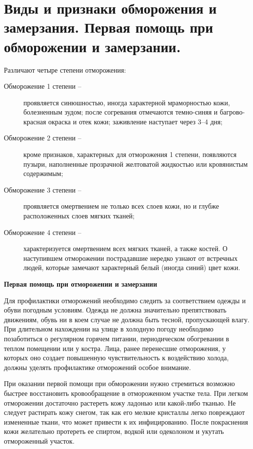\documentclass[12pt,a4paper]{report}
\begin{document}
\section{Виды и признаки обморожения и замерзания. Первая помощь при обморожении и замерзании.}
Различают четыре степени отморожения:
\begin{description}
	
	\item[Обморожение 1 степени –]  проявляется синюшностью, иногда характерной мраморностью кожи, болезненным зудом; после согревания отмечаются темно-синяя и багрово-красная окраска и отек кожи; заживление наступает через 3–4 дня;
	\item[Обморожение 2 степени –] кроме признаков, характерных для отморожения 1 степени, появляются пузыри, наполненные прозрачной желтоватой жидкостью или кровянистым содержимым;
	\item[Обморожение 3 степени –]  проявляется омертвением не только всех слоев кожи, но и глубже расположенных слоев мягких тканей;
	\item[Обморожение 4 степени –]  характеризуется омертвением всех мягких тканей, а также костей.
	О наступившем отморожении пострадавшие нередко узнают от встречных людей, которые замечают характерный белый (иногда синий) цвет кожи.
\end{description}

\textbf{Первая помощь при отморожении и замерзании}

Для профилактики отморожений необходимо следить за соответствием одежды и обуви погодным условиям. Одежда не должна значительно препятствовать движениям, обувь ни в коем случае не должна быть тесной, пропускающей влагу.
При длительном нахождении на улице в холодную погоду необходимо позаботиться о регулярном горячем питании, периодическом обогревании в теплом помещении или у костра. Лица, ранее перенесшие отморожения, у которых оно создает повышенную чувствительность к воздействию холода, должны уделять профилактике отморожений особое внимание.

При оказании первой помощи при обморожении нужно стремиться возможно быстрее восстановить кровообращение в отмороженном участке тела.
При легком отморожении достаточно растереть кожу ладонью или какой-либо тканью. Не следует растирать кожу снегом, так как его мелкие кристаллы легко повреждают измененные ткани, что может привести к их инфицированию. После покраснения кожи желательно протереть ее спиртом, водкой или одеколоном и укутать отмороженный участок.
\end{document}
